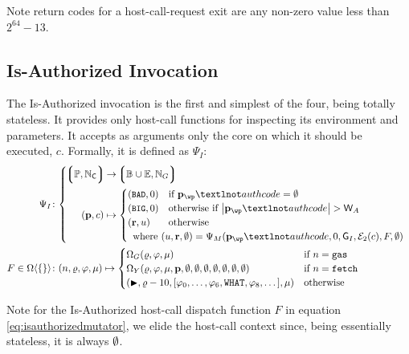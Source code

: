 Note return codes for a host-call-request exit are any non-zero value less than $2^{64} - 13$.

\subsection{Is-Authorized Invocation}\label{sec:isauthorizedinvocation}

The Is-Authorized invocation is the first and simplest of the four, being totally stateless. It provides only host-call functions for inspecting its environment and parameters. It accepts as arguments only the core on which it should be executed, $c$. Formally, it is defined as $\Psi_I$:
\begin{align}
  \label{eq:isauthinvocation}
  \Psi_I &\colon \abracegroup{
    \tuple{\workpackage, \coreindex} &\to \tuple{\blob \cup \workerror, \gas} \\
    \tup{\wpX, c} &\mapsto \begin{cases}
      \tup{\token{BAD}, 0} &\when \wpX_\wp¬authcode = \none \\
      \tup{\token{BIG}, 0} &\otherwhen \len{\wpX_\wp¬authcode} > \Cmaxauthcodesize \\
      \tup{\mathbf{r}, u} &\otherwise \\
      \multicolumn{2}{l}{\where \tup{u, \mathbf{r}, \none} = \Psi_M(\wpX_\wp¬authcode, 0, \Cpackageauthgas, \encode[2]{c}, F, \none)}\\
    \end{cases}\\
  } \\
  \label{eq:isauthorizedmutator}F \in \contextmutator{\emset} &\colon
    \tup{n, \gascounter, \registers, \memory} \mapsto \begin{cases}
      \Omega_G(\gascounter, \registers, \memory) &\when n = \mathtt{gas} \\
      \Omega_Y(\gascounter, \registers, \memory, \wpX, \none, \none, \none, \none, \none, \none, \none) &\when n = \mathtt{fetch} \\
      \tup{\continue, \gascounter - 10, \sq{\registers_0, \dots, \registers_6, \mathtt{WHAT}, \registers_8, \dots}, \memory} &\otherwise
    \end{cases}
\end{align}

Note for the Is-Authorized host-call dispatch function $F$ in equation \ref{eq:isauthorizedmutator}, we elide the host-call context since, being essentially stateless, it is always $\emptyset$.

